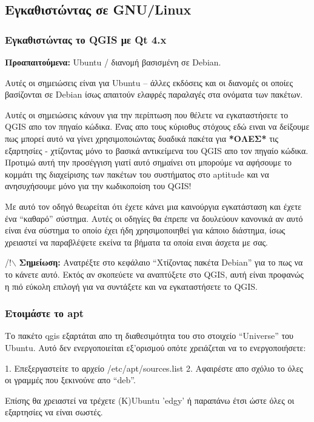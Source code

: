 \hypertarget{toc3}{}
\subsection{Εγκαθιστώντας σε GNU/Linux}
\hypertarget{toc4}{}
\subsubsection{Εγκαθιστώντας το QGIS με Qt 4.x}
\textbf{Προαπαιτούμενα:} Ubuntu / διανομή βασισμένη σε Debian.

Αυτές οι σημειώσεις είναι για Ubuntu – άλλες εκδόσεις και οι διανομές οι οποίες βασίζονται σε Debian ίσως απαιτούν ελαφρές παραλαγές στα ονόματα των πακέτων.

Αυτές οι σημειώσεις κάνουν για την περίπτωση που θέλετε να εγκαταστήσετε το QGIS απο τον πηγαίο κώδικα. Ένας απο τους κύριοθυς στόχους εδώ ειναι να δείξουμε πως μπορεί αυτό να γίνει χρησιμοποιώντας δυαδικά πακέτα για \textbf{*ΟΛΕΣ*}
τις εξαρτησίες - χτίζοντας μόνο το βασικά αντικείμενα του QGIS απο τον πηγαίο κώδικα. Προτιμώ αυτή την προσέγγιση γιατί αυτό σημαίνει οτι μπορούμε να αφήσουμε το κομμάτι της διαχείρισης των πακέτων του συστήματος στο aptitude και να ανησυχήσουμε μόνο για την κωδικοποίση του QGIS!  

Με αυτό τον οδηγό θεωρείται ότι έχετε κάνει μια καινούργια εγκατάσταση και έχετε ένα “καθαρό” σύστημα. Αυτές οι οδηγίες θα έπρεπε να δουλεύουν κανονικά αν αυτό είναι ένα σύστημα το οποίο έχει ήδη χρησιμοποιηθεί για κάποιο διάστημα, ίσως χρειαστεί να παραβλέψετε εκείνα τα βήματα τα οποία ειναι άσχετα με σας.

/!$\backslash$ \textbf{Σημείωση:} Ανατρέξτε στο κεφάλαιο “Χτίζοντας πακέτα Debian” για το πως να το κάνετε αυτό. Εκτός αν σκοπεύετε να αναπτύξετε στο QGIS, αυτή είναι προφανώς η πιό εύκολη επιλογή για να συντάξετε και να εγκαταστήσετε το QGIS.

\hypertarget{toc5}{}
\subsubsection{Ετοιμάστε το apt}
Το πακέτο qgis εξαρτάται απο τη διαθεσιμότητα του στο στοιχείο “Universe” του Ubuntu. Αυτό δεν ενεργοποιείται εξ'ορισμού οπότε χρειάζεται να το ενεργοποιήσετε: 

1. Επεξεργαστείτε το αρχείο /etc/apt/sources.list  
2. Αφαιρέστε απο σχόλιο το όλες οι γραμμές που ξεκινούνε απο “deb”.

Επίσης θα χρειαστεί να τρέχετε (K)Ubuntu 'edgy' ή παραπάνω έτσι ώστε όλες οι εξαρτησίες να είναι σωστές.

